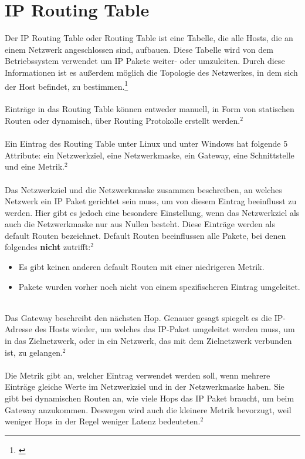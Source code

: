 \section{IP Routing Table}
Der IP Routing Table oder Routing Table ist eine Tabelle, die alle Hosts, die an einem Netzwerk angeschlossen sind, aufbauen. Diese Tabelle wird von dem Betriebssystem verwendet um IP Pakete weiter- oder umzuleiten. Durch diese Informationen ist es außerdem möglich die Topologie des Netzwerkes, in dem sich der Host befindet, zu bestimmen.\footnote[2]{\cite[Vgl.][]{2}}
\\\\
Einträge in das Routing Table können entweder manuell, in Form von statischen Routen oder dynamisch, über Routing Protokolle erstellt werden.$^{2}$
\\\\
Ein Eintrag des Routing Table unter Linux und unter Windows hat folgende 5 Attribute: ein Netzwerkziel, eine Netzwerkmaske, ein Gateway, eine Schnittstelle und eine Metrik.$^{2}$
\\\\
Das Netzwerkziel und die Netzwerkmaske zusammen beschreiben, an welches Netzwerk ein IP Paket gerichtet sein muss, um von diesem Eintrag beeinflusst zu werden. Hier gibt es jedoch eine besondere Einstellung, wenn das Netzwerkziel als auch die Netzwerkmaske nur aus Nullen besteht. Diese Einträge werden als default Routen bezeichnet. Default Routen beeinflussen alle Pakete, bei denen folgendes \textbf{nicht} zutrifft:$^{2}$ 
\\
\begin{itemize}
    \item Es gibt keinen anderen default Routen mit einer niedrigeren Metrik.
    \item Pakete wurden vorher noch nicht von einem spezifischeren Eintrag umgeleitet.
\end{itemize}
\ \\
Das Gateway beschreibt den nächsten Hop. Genauer gesagt spiegelt es die IP-Adresse des Hosts wieder, um welches das IP-Paket umgeleitet werden muss, um in das Zielnetzwerk, oder in ein Netzwerk, das mit dem Zielnetzwerk verbunden ist, zu gelangen.$^{2}$
\\\\
Die Metrik gibt an, welcher Eintrag verwendet werden soll, wenn mehrere Einträge gleiche Werte im Netzwerkziel und in der Netzwerkmaske haben. Sie gibt bei dynamischen Routen an, wie viele Hops das IP Paket braucht, um beim Gateway anzukommen. Deswegen wird auch die kleinere Metrik bevorzugt, weil weniger Hops in der Regel weniger Latenz bedeuteten.$^{2}$
